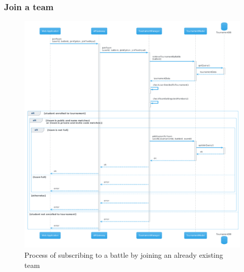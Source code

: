 \subsubsection{Join a team}
\begin{figure}[H]
    \hspace{-0.7cm}
    \includegraphics[width=1.1\textwidth]{Diagrams/sequence/join_team.png}
    \caption{Process of subscribing to a battle by joining an already existing team}
\end{figure}

